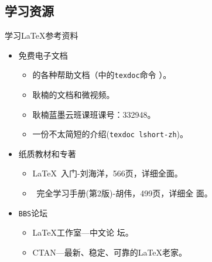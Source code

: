 \documentclass[fontset = none, xcolor=svgnames, t, aspectratio=169]{ctexbeamer}
\begin{document}
\subsection{学习资源}
\begin{frame}[t]{学习\LaTeX}{参考资料}
  \stretchon
  \begin{itemize}
  \item \alert{免费}电子文档
    \begin{itemize}
    \item \TeXLive 的各种帮助文档（\TeXLive 中的\alert{\texttt{texdoc}}命令
      ）。
    \item 耿楠的文档和微视频。
    \item 耿楠蓝墨云班课班课号：332948。
    \item 一份不太简短的{\LaTeXe}介绍(\texttt{texdoc lshort-zh})。
    \end{itemize}
  \item 纸质教材和专著
    \begin{itemize}
    \item {\LaTeX}~入门-刘海洋，566页，详细全面。
    \item {\LaTeXe}~完全学习手册(第2版)-胡伟，499页，详细全
      面。
    \end{itemize}
  \item \texttt{BBS}论坛
    \begin{itemize}
    \item {\LaTeX}工作室---中文论
      坛。  
    \item {CTAN}---最新、稳定、可靠的{\LaTeX}老家。    
    \end{itemize}
  \end{itemize}
  \stretchoff
\end{frame}
\end{document}
